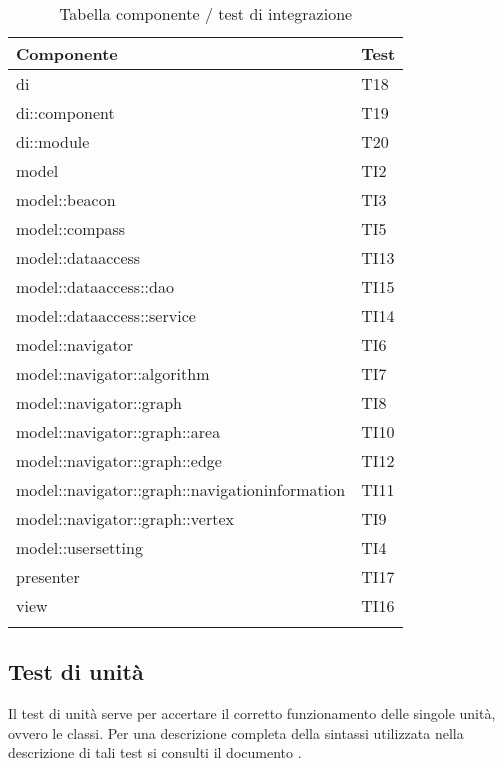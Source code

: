\documentclass[../PianoDiQualifica.tex]{subfiles}
\begin{document}
\begin{appendices}
\begin{longtabu}to \textwidth{X[3] X[0.5]}
\toprule
\textbf{Componente} & \textbf{Test}\\
\midrule
\endhead
{}
di & T18 \\ 
\midrule 
di::\-component & T19 \\ 
\midrule 
di::\-module & T20 \\ 
\midrule 
model & TI2 \\ 
\midrule 
model::\-beacon & TI3 \\ 
\midrule 
model::\-compass & TI5 \\ 
\midrule 
model::\-dataaccess & TI13 \\ 
\midrule 
model::\-dataaccess::\-dao & TI15 \\ 
\midrule 
model::\-dataaccess::\-service & TI14 \\ 
\midrule 
model::\-navigator & TI6 \\ 
\midrule 
model::\-navigator::\-algorithm & TI7 \\ 
\midrule 
model::\-navigator::\-graph & TI8 \\ 
\midrule 
model::\-navigator::\-graph::\-area & TI10 \\ 
\midrule 
model::\-navigator::\-graph::\-edge & TI12 \\ 
\midrule 
model::\-navigator::\-graph::\-navigationinformation & TI11 \\ 
\midrule 
model::\-navigator::\-graph::\-vertex & TI9 \\ 
\midrule 
model::\-usersetting & TI4 \\ 
\midrule 
presenter & TI17 \\ 
\midrule 
view & TI16 \\ 
\bottomrule
\caption{Tabella componente / test di integrazione} \\
\end{longtabu}

\subsection{Test di unità}
Il test di unità serve per accertare il corretto funzionamento delle singole unità, ovvero le classi. Per una descrizione completa della sintassi utilizzata nella descrizione di tali test si consulti il documento \normediprogettov.
	

\end{appendices}
\end{document}
